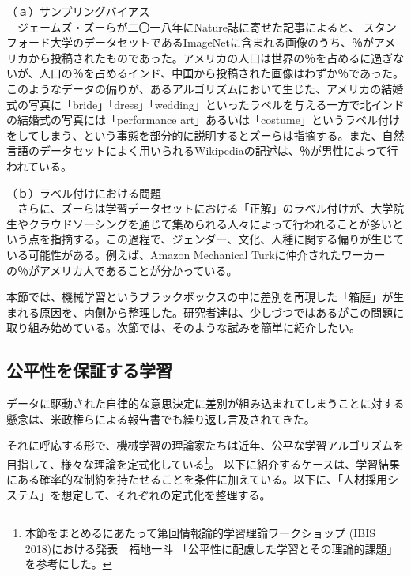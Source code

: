 \documentclass[b5j,twoside,twocolumn]{utarticle}
\begin{document}
（ａ）サンプリングバイアス\\
~~ジェームズ・ズーらが二〇一八年にNature誌に寄せた記事\cite{articleZou}によると、
スタンフォード大学のデータセットであるImageNetに含まれる画像のうち、％がアメリカから投稿されたものであった。アメリカの人口は世界の％を占めるに過ぎないが、人口の％を占めるインド、中国から投稿された画像はわずか％であった。このようなデータの偏りが、あるアルゴリズムにおいて生じた、アメリカの結婚式の写真に「bride」「dress」「wedding」といったラベルを与える一方で北インドの結婚式の写真には「performance art」あるいは「costume」というラベル付けをしてしまう\cite{shankar2017classification}、という事態を部分的に説明するとズーらは指摘する。また、自然言語のデータセットによく用いられるWikipediaの記述は、％が男性によって行われている\cite{inproceedings}。


（ｂ）ラベル付けにおける問題\\
~~さらに、ズーらは学習データセットにおける「正解」のラベル付けが、大学院生やクラウドソーシングを通じて集められる人々によって行われることが多いという点を指摘する。この過程で、ジェンダー、文化、人種に関する偏りが生じている可能性がある。例えば、Amazon Mechanical Turkに仲介されたワーカーの％がアメリカ人であることが分かっている\cite{Difallah2018DemographicsAD}。


本節では、機械学習というブラックボックスの中に差別を再現した「箱庭」が生まれる原因を、\.内\.側から整理した。研究者達は、少しづつではあるがこの問題に取り組み始めている。次節では、そのような試みを簡単に紹介したい。


\subsection{公平性を保証する学習}
データに駆動された自律的な意思決定に差別が組み込まれてしまうことに対する懸念は、米政権らによる報告書でも繰り返し言及されてきた\cite{obama}\cite{obama2}。

それに呼応する形で、機械学習の理論家たちは近年、公平な学習アルゴリズムを目指して、様々な理論を定式化している\footnote{本節をまとめるにあたって第回情報論的学習理論ワークショップ (IBIS 2018)における発表　福地一斗 「公平性に配慮した学習とその理論的課題」を参考にした。}。
以下に紹介するケースは、学習結果にある確率的な制約を持たせることを条件に加えている。以下に、「人材採用システム」を想定して、それぞれの定式化を整理する。
\end{document}

